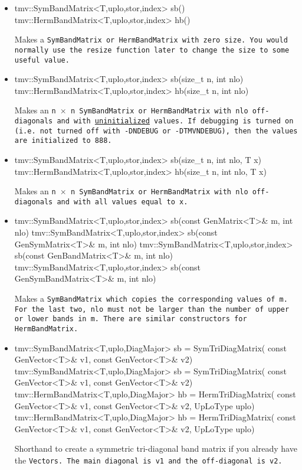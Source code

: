 \begin{itemize}

\item
\begin{tmvcode}
tmv::SymBandMatrix<T,uplo,stor,index> sb()
tmv::HermBandMatrix<T,uplo,stor,index> hb()
\end{tmvcode}
Makes a \tt{SymBandMatrix} or \tt{HermBandMatrix} with zero size.  You would normally use the \tt{resize} function later to
change the size to some useful value.

\item 
\begin{tmvcode}
tmv::SymBandMatrix<T,uplo,stor,index> sb(size_t n, int nlo)
tmv::HermBandMatrix<T,uplo,stor,index> hb(size_t n, int nlo)
\end{tmvcode}
Makes an \tt{n} $\times$ \tt{n} \tt{SymBandMatrix} or \tt{HermBandMatrix} with 
\tt{nlo} off-diagonals
and with \underline{uninitialized} values.
If debugging is turned on (i.e. not turned off 
with \tt{-DNDEBUG} or \tt{-DTMVNDEBUG}), then the values are initialized to 888.

\item
\begin{tmvcode}
tmv::SymBandMatrix<T,uplo,stor,index> sb(size_t n, int nlo, T x)
tmv::HermBandMatrix<T,uplo,stor,index> hb(size_t n, int nlo, T x)
\end{tmvcode}
Makes an \tt{n} $\times$ \tt{n} \tt{SymBandMatrix}  or \tt{HermBandMatrix} with \tt{nlo} off-diagonals
and with all values equal to \tt{x}.

\item 
\begin{tmvcode}
tmv::SymBandMatrix<T,uplo,stor,index> sb(const GenMatrix<T>& m, 
      int nlo)
tmv::SymBandMatrix<T,uplo,stor,index> sb(const GenSymMatrix<T>& m, 
      int nlo)
tmv::SymBandMatrix<T,uplo,stor,index> sb(const GenBandMatrix<T>& m, 
      int nlo)
tmv::SymBandMatrix<T,uplo,stor,index> sb(const GenSymBandMatrix<T>& m, 
      int nlo)
\end{tmvcode}
Makes a \tt{SymBandMatrix} which copies the corresponding values of \tt{m}.  
For the last two, \tt{nlo} must not be larger than the number of upper
or lower bands in \tt{m}.  There are similar constructors for \tt{HermBandMatrix}.

\item
\begin{tmvcode}
tmv::SymBandMatrix<T,uplo,DiagMajor> sb = SymTriDiagMatrix(
      const GenVector<T>& v1, const GenVector<T>& v2)
tmv::SymBandMatrix<T,uplo,DiagMajor> sb = SymTriDiagMatrix(
      const GenVector<T>& v1, const GenVector<T>& v2)
tmv::HermBandMatrix<T,uplo,DiagMajor> hb = HermTriDiagMatrix(
      const GenVector<T>& v1, const GenVector<T>& v2, 
      UpLoType uplo)
tmv::HermBandMatrix<T,uplo,DiagMajor> hb = HermTriDiagMatrix(
      const GenVector<T>& v1, const GenVector<T>& v2, 
      UpLoType uplo)
\end{tmvcode}
Shorthand to create a symmetric tri-diagonal band matrix
if you already have the \tt{Vector}s.  
The main diagonal is \tt{v1} and the off-diagonal is \tt{v2}.


\end{itemize}

